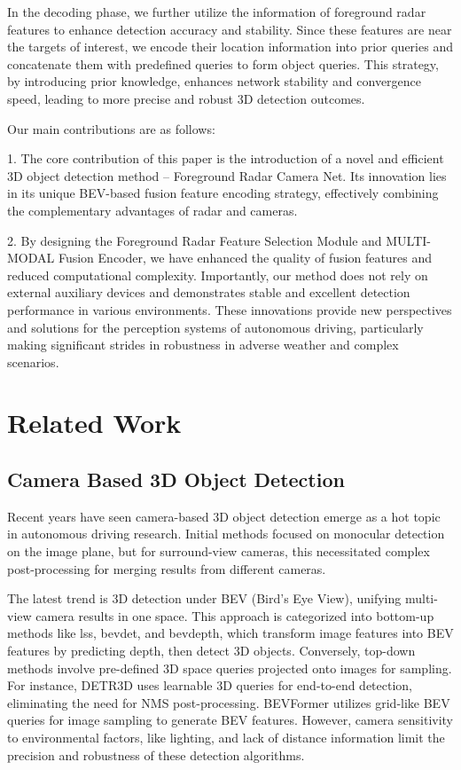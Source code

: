 \documentclass{article}
\begin{document}
In the decoding phase, we further utilize the information of foreground radar features to enhance detection accuracy and stability. Since these features are near the targets of interest, we encode their location information into prior queries and concatenate them with predefined queries to form object queries. This strategy, by introducing prior knowledge, enhances network stability and convergence speed, leading to more precise and robust 3D detection outcomes.

Our main contributions are as follows:

1. The core contribution of this paper is the introduction of a novel and efficient 3D object detection method – Foreground Radar Camera Net. Its innovation lies in its unique BEV-based fusion feature encoding strategy, effectively combining the complementary advantages of radar and cameras.


2. By designing the Foreground Radar Feature Selection Module and MULTI-MODAL Fusion Encoder, we have enhanced the quality of fusion features and reduced computational complexity. Importantly, our method does not rely on external auxiliary devices and demonstrates stable and excellent detection performance in various environments. These innovations provide new perspectives and solutions for the perception systems of autonomous driving, particularly making significant strides in robustness in adverse weather and complex scenarios.


\section{Related Work}

\subsection{Camera Based 3D Object Detection}

Recent years have seen camera-based 3D object detection emerge as a hot topic in autonomous driving research. Initial methods focused on monocular detection on the image plane, but for surround-view cameras, this necessitated complex post-processing for merging results from different cameras.

The latest trend is 3D detection under BEV (Bird's Eye View), unifying multi-view camera results in one space. This approach is categorized into bottom-up methods like lss, bevdet, and bevdepth, which transform image features into BEV features by predicting depth, then detect 3D objects. Conversely, top-down methods involve pre-defined 3D space queries projected onto images for sampling. For instance, DETR3D uses learnable 3D queries for end-to-end detection, eliminating the need for NMS post-processing. BEVFormer utilizes grid-like BEV queries for image sampling to generate BEV features. However, camera sensitivity to environmental factors, like lighting, and lack of distance information limit the precision and robustness of these detection algorithms.
\end{document}

